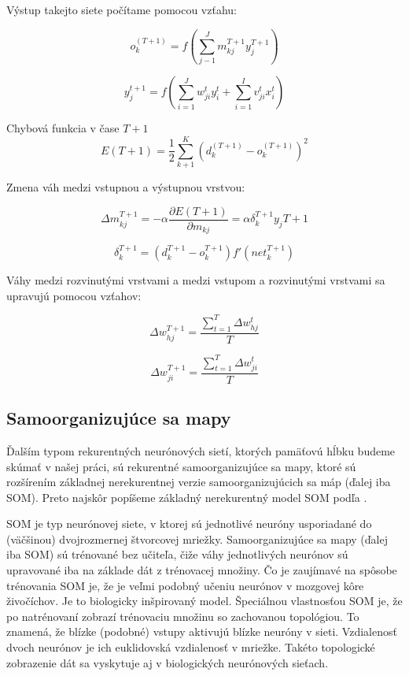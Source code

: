 Výstup takejto siete počítame pomocou vzťahu:

\begin{equation}
	o_{k}^{(T+1)} = f(\sum_{j-1}^{J}m_{kj}^{T+1}y_{j}^{T+1})
\end{equation}

\begin{equation}
	y_{j}^{t+1} = f (\sum_{i=1}^{J}w_{ji}^{t}y_{i}^{t} + \sum_{i=1}^{I}v_{ji}^{t}x_{i}^{t})
\end{equation}

Chybová funkcia  v čase $T + 1$
\begin{equation}
	E(T+1) = \frac{1}{2} \sum_{k+1}^{K}(d_{k}^{(T+1)} - o_{k}^{(T+1)})^{2}
\end{equation}

Zmena váh medzi vstupnou a výstupnou vrstvou:

\begin{equation}
	\Delta m_{kj}^{T+1} = -\alpha\frac{\partial E(T+1)}{\partial m_{kj}} = \alpha \delta_{k}^{T+1}y_{j}{T+1}
\end{equation}

\begin{equation}
	\delta_{k}^{T+1} = (d_{k}^{T+1} - o_{k}^{T+1})f'(net_{k}^{T+1})
\end{equation}

Váhy medzi rozvinutými vrstvami a medzi vstupom a rozvinutými vrstvami sa upravujú pomocou vzťahov:

\begin{equation}
	\Delta w_{hj}^{T+1} = \frac{\sum_{t=1}^{T} \Delta w_{hj}^{t}}{T}
\end{equation}

\begin{equation}
	\Delta w_{ji}^{T+1} = \frac{\sum_{t=1}^{T} \Delta w_{ji}^{t}}{T}
\end{equation}



\subsection{Samoorganizujúce sa mapy}
Ďalším typom rekurentných neurónových sietí, ktorých pamäťovú hĺbku budeme 
skúmať v našej práci, sú rekurentné samoorganizujúce sa mapy, 
ktoré sú rozšírením základnej nerekurentnej verzie samoorganizujúcich sa máp (ďalej iba SOM). 
Preto najskôr popíšeme základný nerekurentný model SOM podľa \cite{Ritter:1989:SSM:2730681.2730708}.


SOM je typ neurónovej siete, v ktorej sú jednotlivé neuróny usporiadané do (väčšinou) dvojrozmernej štvorcovej mriežky. Samoorganizujúce sa mapy (ďalej iba SOM) sú trénované bez učiteľa, čiže váhy jednotlivých neurónov sú upravované iba na základe dát z trénovacej množiny. 
Čo je zaujímavé na spôsobe trénovania SOM je, že je veľmi podobný učeniu neurónov v mozgovej kôre živočíchov. Je to biologicky inšpirovaný model.
Špeciálnou vlastnosťou SOM je, že po natrénovaní zobrazí trénovaciu množinu so zachovanou topológiou. To znamená, že blízke (podobné) vstupy aktivujú blízke neuróny v sieti. Vzdialenosť dvoch neurónov je ich euklidovská vzdialenosť v mriežke. Takéto topologické zobrazenie dát sa vyskytuje aj v biologických neurónových sieťach.

